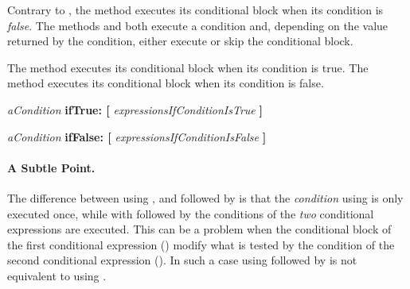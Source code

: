 Contrary to , the method  executes its conditional block when its condition is \emph{false}. The methods  and  both execute a condition and, depending on the value returned by the condition, either execute or skip the conditional block. 


%



The method  executes its conditional block when its condition is true.
The method  executes its conditional block when its condition is false.

\begin{nalltt}
\textit{aCondition}
      \textbf{ifTrue: [} \textit{expressionsIfConditionIsTrue} \textbf{]}

\textit{aCondition}
      \textbf{ifFalse: [} \textit{expressionsIfConditionIsFalse} \textbf{]}
\end{nalltt}

\paragraph{A Subtle Point.} The difference between using , and  followed by  is that the \textit{condition} using  is only executed once, while with  followed by  the conditions of the \emph{two} conditional expressions are executed. This can be a problem when the conditional block of the first conditional expression () modify what is tested by the condition of the second conditional expression (). In such a case using  followed by  is not equivalent to using .


